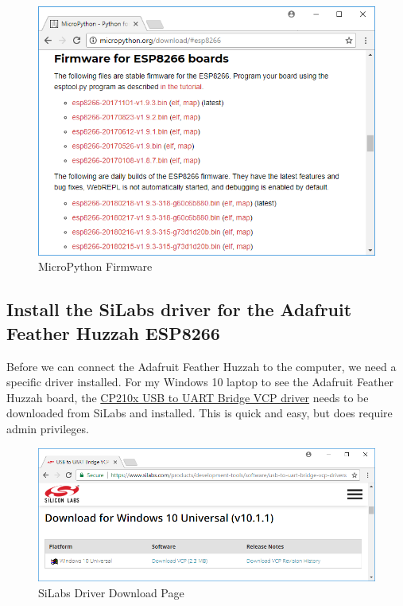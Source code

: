 \documentclass{book}
\makeatletter
\def\maxwidth{\ifdim\Gin@nat@width>\linewidth\linewidth
    \else\Gin@nat@width\fi}
\let\Oldincludegraphics\includegraphics
\renewcommand{\includegraphics}[1]{\Oldincludegraphics[width=.8\maxwidth]{#1}}
\makeatother
\begin{document}
\begin{figure}
\centering
\includegraphics{images/firmware_download_page.PNG}
\caption{MicroPython Firmware}
\end{figure}
    




    
        \subsection{Install the SiLabs driver for the Adafruit Feather Huzzah
ESP8266}\label{install-the-silabs-driver-for-the-adafruit-feather-huzzah-esp8266}
    




    
        Before we can connect the Adafruit Feather Huzzah to the computer, we
need a specific driver installed. For my Windows 10 laptop to see the
Adafruit Feather Huzzah board, the
\href{https://www.silabs.com/products/development-tools/software/usb-to-uart-bridge-vcp-drivers}{CP210x
USB to UART Bridge VCP driver} needs to be downloaded from SiLabs and
installed. This is quick and easy, but does require admin privileges.

\begin{figure}
\centering
\includegraphics{images/download_silabs_driver.PNG}
\caption{SiLabs Driver Download Page}
\end{figure}
    
\end{document}

